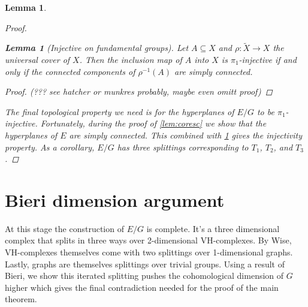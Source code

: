 \documentclass[12pt,parskip=full]{report}
\theoremstyle{plain}
\newtheorem{lem}[thm]{Lemma}
\theoremstyle{definition}
\begin{document}
\begin{lem}
\begin{proof}
    
        
        \begin{lem}
            [Injective on fundamental groups]
            \label{lem:injpi1}
            Let \(A\subseteq X\) and \(\rho:\widetilde X\to X\) the universal cover of \(X\). Then the inclusion map of \(A\) into \(X\) is \(\pi_1\)-injective if and only if the connected components of \(\rho^{-1}(A)\) are simply connected.
            \begin{proof}
                (??? see hatcher or munkres probably, maybe even omitt proof)
            \end{proof}
        \end{lem}
        
        The final topological property we need is for the hyperplanes of \(E/G\) to be \(\pi_1\)-injective. Fortunately, during the proof of \ref{lem:coresc} we show that the hyperplanes of \(E\) are simply connected. This combined with \ref{lem:injpi1} gives the injectivity property. As a corollary, \(E/G\) has three splittings corresponding to \(T_1\), \(T_2\), and \(T_3\).

    \end{proof}
\end{lem}


\section{Bieri dimension argument}

At this stage the construction of \(E/G\) is complete. It's a three dimensional complex that splits in three ways over 2-dimensional VH-complexes. By Wise, VH-complexes themselves come with two splittings over 1-dimensional graphs. Lastly, graphs are themselves splittings over trivial groups. Using a result of Bieri, we show this iterated splitting pushes the cohomological dimension of \(G\) higher which gives the final contradiction needed for the proof of the main theorem.
\end{document}

